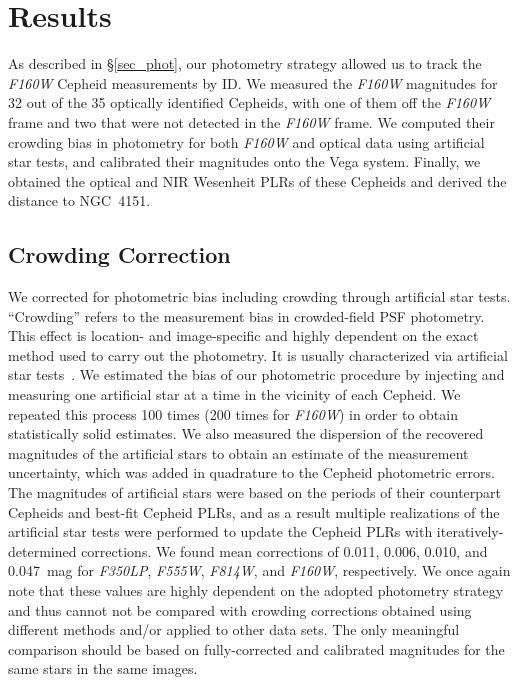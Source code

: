 \documentclass[twocolumn]{aastex63}
\newcommand{\ngs}{NGC\ 4151}
\newcommand{\hsth}{{\it F160W} }
\newcommand{\hstws}{{\it F350LP}}
\newcommand{\hstvs}{{\it F555W}}
\newcommand{\hstis}{{\it F814W}}
\newcommand{\hsths}{{\it F160W}}
\begin{document}
\section{Results}

As described in \S\ref{sec_phot}, our photometry strategy allowed us to track the \hsth Cepheid measurements by ID. We measured the \hsth magnitudes for 32 out of the 35 optically identified Cepheids, with one of them off the \hsth frame and two that were not detected in the \hsth frame. We computed their crowding bias in photometry for both \hsth and optical data using artificial star tests, and calibrated their magnitudes onto the Vega system. Finally, we obtained the optical and NIR Wesenheit PLRs of these Cepheids and derived the distance to \ngs.

\subsection{Crowding Correction}

We corrected for photometric bias including crowding through artificial star tests. ``Crowding'' refers to the measurement bias in crowded-field PSF photometry. This effect is location- and image-specific and highly dependent on the exact method used to carry out the photometry. It is usually characterized via artificial star tests~\citep[e.g., ][]{1988AJ.....96..909S,1996AJ....112.1928G,2006ApJS..166..534H}. We estimated the bias of our photometric procedure by injecting and measuring one artificial star at a time in the vicinity of each Cepheid. We repeated this process 100 times (200 times for \hsths) in order to obtain statistically solid  estimates. We also measured the dispersion of the recovered magnitudes of the artificial stars to obtain an estimate of the measurement uncertainty, which was added in quadrature to the Cepheid photometric errors. The magnitudes of artificial stars were based on the periods of their counterpart Cepheids and best-fit Cepheid PLRs, and as a result multiple realizations of the artificial star tests were performed to update the Cepheid PLRs with iteratively-determined corrections. We found mean corrections of 0.011, 0.006, 0.010, and 0.047~mag for \hstws, \hstvs, \hstis, and \hsths, respectively. We once again note that these values are highly dependent on the adopted photometry strategy and thus cannot not be compared with crowding corrections obtained using different methods and/or applied to other data sets. The only meaningful comparison should be based on fully-corrected and calibrated magnitudes for the same stars in the same images.
\end{document}
